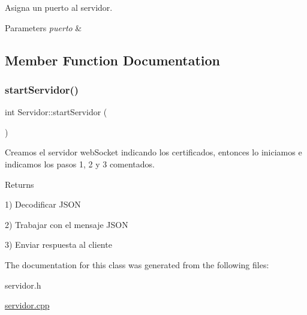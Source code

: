 Asigna un puerto al servidor. 


\begin{DoxyParams}{Parameters}
{\em puerto} & \\
\hline
\end{DoxyParams}


\subsection{Member Function Documentation}
\mbox{\label{classServidor_a43733f2069b63eb58edcbb61fa6a63ec}} 
\subsubsection{\texorpdfstring{start\+Servidor()}{startServidor()}}
{\footnotesize\ttfamily int Servidor\+::start\+Servidor (\begin{DoxyParamCaption}{ }\end{DoxyParamCaption})}



Creamos el servidor web\+Socket indicando los certificados, entonces lo iniciamos e indicamos los pasos 1, 2 y 3 comentados. 

\begin{DoxyReturn}{Returns}

\end{DoxyReturn}
1) Decodificar J\+S\+ON

2) Trabajar con el mensaje J\+S\+ON

3) Enviar respuesta al cliente 

The documentation for this class was generated from the following files\+:\begin{DoxyCompactItemize}
\item 
servidor.\+h\item 
\mbox{\hyperlink{servidor_8cpp}{servidor.\+cpp}}\end{DoxyCompactItemize}
